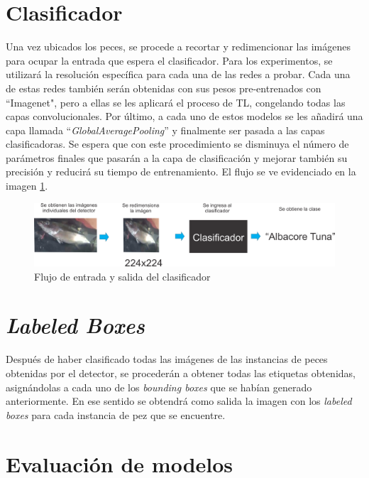 \section{Clasificador}
Una vez ubicados los peces, se procede a recortar y redimencionar las imágenes para ocupar la entrada que espera el clasificador. Para los experimentos, se utilizará la resolución específica para cada una de las redes a probar. Cada una de estas redes también serán obtenidas con sus pesos pre-entrenados con ``Imagenet", pero a ellas se les aplicará el proceso de TL, congelando todas las capas convolucionales. Por último, a cada uno de estos modelos se les añadirá una capa llamada ``\textit{GlobalAveragePooling}'' y finalmente ser pasada a las capas clasificadoras. Se espera que con este procedimiento se disminuya el número de parámetros finales que pasarán a la capa de clasificación y mejorar también su precisión y reducirá su tiempo de entrenamiento. El flujo se ve evidenciado en la imagen \ref{fig:clasificador_pez}.
\begin{figure}[h!]
\includegraphics[width=1\textwidth]{images/clasificador_label.png}
\caption{Flujo de entrada y salida del clasificador }
\label{fig:clasificador_pez}
\end{figure}

\section{\textit{Labeled Boxes}}
Después de haber clasificado todas las imágenes de las instancias de peces obtenidas por el detector, se procederán a obtener todas las etiquetas obtenidas, asignándolas a cada uno de los \textit{bounding boxes} que se habían generado anteriormente. En ese sentido se obtendrá como salida la imagen con los \textit{labeled boxes} para cada instancia de pez que se encuentre. 

\section{Evaluación de modelos}

